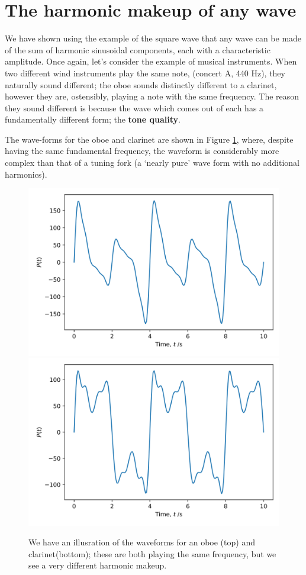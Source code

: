 \documentclass[
]{book}
\begin{document}
\hypertarget{sec:ch11-harmonicwavemakeup1}{%
\section{The harmonic makeup of any wave}\label{sec:ch11-harmonicwavemakeup1}}

We have shown using the example of the square wave that any wave can be made of the sum of harmonic sinusoidal components, each with a characteristic amplitude. Once again, let's consider the example of musical instruments. When two different wind instruments play the same note, (concert A, 440 Hz), they naturally sound different; the oboe sounds distinctly different to a clarinet, however they are, ostensibly, playing a note with the same frequency. The reason they sound different is because the wave which comes out of each has a fundamentally different form; the \textbf{tone quality}.

The wave-forms for the oboe and clarinet are shown in Figure \ref{fig:ch11-oboeclarinetwaveform1}, where, despite having the same fundamental frequency, the waveform is considerably more complex than that of a tuning fork (a `nearly pure' wave form with no additional harmonics).

\begin{figure}

{\centering \includegraphics[width=0.7\linewidth]{visualisations/slides-harmonicsum_oboe} \includegraphics[width=0.7\linewidth]{visualisations/slides-harmonicsum_clar} 

}

\caption{We have an illusration of the waveforms for an oboe (top) and clarinet(bottom); these are both playing the same frequency, but we see a very different harmonic makeup.}\label{fig:ch11-oboeclarinetwaveform1}
\end{figure}
\end{document}

